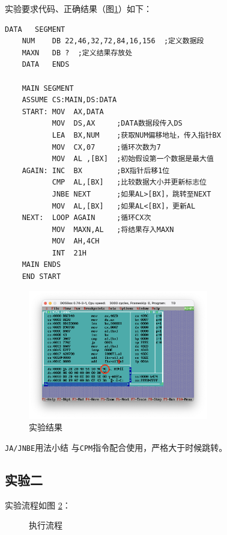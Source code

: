 \documentclass[11pt]{SEU-Digital-Report}
\begin{document}
实验要求代码、正确结果（图\ref{fig:rlt1}）如下：
\begin{lstlisting}[language={[x86masm]Assembler},title=exp31.asm]
    DATA   SEGMENT
    NUM    DB 22,46,32,72,84,16,156  ;定义数据段
    MAXN   DB ?  ;定义结果存放处
    DATA   ENDS

    MAIN SEGMENT 
    ASSUME CS:MAIN,DS:DATA
    START: MOV  AX,DATA
           MOV  DS,AX     ;DATA数据段传入DS
           LEA  BX,NUM    ;获取NUM偏移地址，传入指针BX
           MOV  CX,07     ;循环次数为7
           MOV  AL ,[BX]  ;初始假设第一个数据是最大值
    AGAIN: INC  BX        ;BX指针后移1位
           CMP  AL,[BX]   ;比较数据大小并更新标志位
           JNBE NEXT      ;如果AL>[BX]，跳转至NEXT
           MOV  AL,[BX]   ;如果AL<[BX]，更新AL
    NEXT:  LOOP AGAIN     ;循环CX次
           MOV  MAXN,AL   ;将结果存入MAXN
           MOV  AH,4CH
           INT  21H
    MAIN ENDS
    END START
\end{lstlisting}

\begin{figure}[htbp]
    \centering
    \includegraphics[width=0.7\textwidth]{fig/rlt1.png}
    \caption{实验结果}
    \label{fig:rlt1}
\end{figure}

\begin{note}{\texttt{JA/JNBE}用法小结}{}
    与\texttt{CPM}指令配合使用，严格大于时候跳转。
\end{note}

\subsection{实验二}
实验流程如图 \ref{fig:exp32}：
\begin{figure}[hbpt]
    \centering
    
    \caption{执行流程}
    \label{fig:exp32}
\end{figure}
\end{document}
